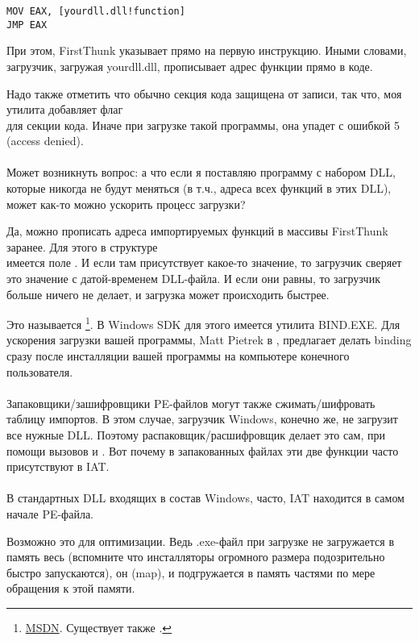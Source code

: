 \begin{lstlisting}
MOV EAX, [yourdll.dll!function]
JMP EAX
\end{lstlisting}

При этом, FirstThunk указывает прямо на первую инструкцию.
Иными словами, загрузчик, загружая yourdll.dll, прописывает адрес функции  прямо в коде.

Надо также отметить что обычно секция кода защищена от записи, так что, моя утилита добавляет флаг \\
для секции кода. Иначе при загрузке такой программы, она упадет с ошибкой 5 (access denied). \\
\\
Может возникнуть вопрос: а что если я поставляю программу с набором DLL,
которые никогда не будут меняться (в т.ч., адреса всех функций в этих DLL), может как-то можно ускорить процесс загрузки?

Да, можно прописать адреса импортируемых функций в массивы FirstThunk заранее.
Для этого в структуре \\
 имеется поле .
И если там присутствует какое-то значение, то загрузчик сверяет это значение с датой-временем DLL-файла.
И если они равны, то загрузчик больше ничего не делает, и загрузка может происходить быстрее.

Это называется 
\footnote{\href{http://go.yurichev.com/17050}{MSDN}.
Существует также .}.
В Windows SDK для этого имеется утилита BIND.EXE.
Для ускорения загрузки вашей программы, 
Matt Pietrek в \PietrekPEURL, предлагает делать binding сразу после инсталляции
вашей программы на компьютере конечного пользователя. \\
\\
Запаковщики/зашифровщики PE-файлов могут также сжимать/шифровать таблицу импортов.
В этом случае, загрузчик Windows, конечно же, не загрузит все нужные DLL.
Поэтому распаковщик/расшифровщик делает это сам, при помощи вызовов  и .
Вот почему в запакованных файлах эти две функции часто присутствуют в \ac{IAT}. \\
\\
В стандартных DLL входящих в состав Windows, часто, \ac{IAT} находится в самом начале PE-файла.

Возможно это для оптимизации.
Ведь .exe-файл при загрузке не загружается в память весь 
(вспомните что инсталляторы огромного размера подозрительно быстро запускаются), он  (map), 
и подгружается в память частями по мере обращения к этой памяти.

